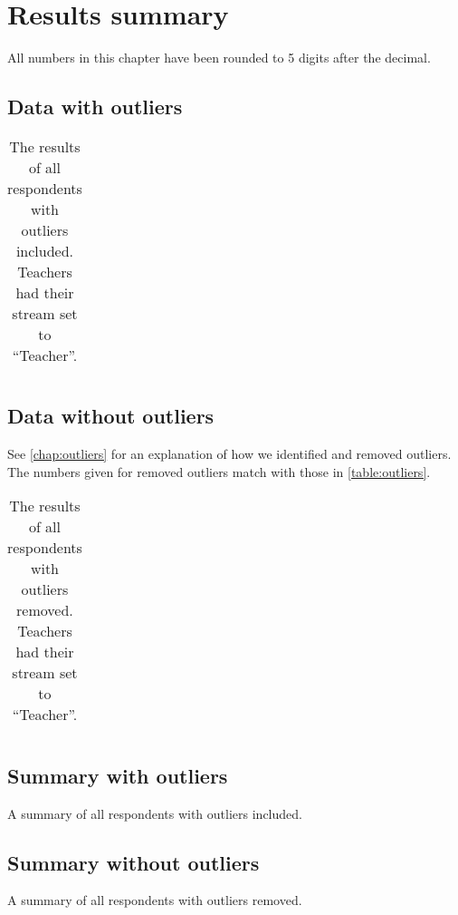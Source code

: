 \chapter{Results summary}
All numbers in this chapter have been rounded to 5 digits after the decimal.

\section{Data with outliers}
\begin{longtable}{rrrlll}
	\caption{The results of all respondents with outliers included. Teachers had their stream set to ``Teacher''.}
	\label{table:outliers}
	
\end{longtable}

\section{Data without outliers}
See \vref{chap:outliers} for an explanation of how we identified and removed outliers.
The numbers given for removed outliers match with those in \vref{table:outliers}.
\begin{longtable}{rrrlll}
	\caption{The results of all respondents with outliers removed. Teachers had their stream set to ``Teacher''.}
	\label{table:noOutliers}
	
\end{longtable}

\section{Summary with outliers}
\begin{table}[H]
	\caption{A summary of all respondents with outliers included.}
	\label{table:outliersSummary}
	\begin{center}
		
	\end{center}
\end{table}

\section{Summary without outliers}
\begin{table}[H]
	\caption{A summary of all respondents with outliers removed.}
	\label{table:noOutliersSummary}
	\begin{center}
		
	\end{center}
\end{table}
